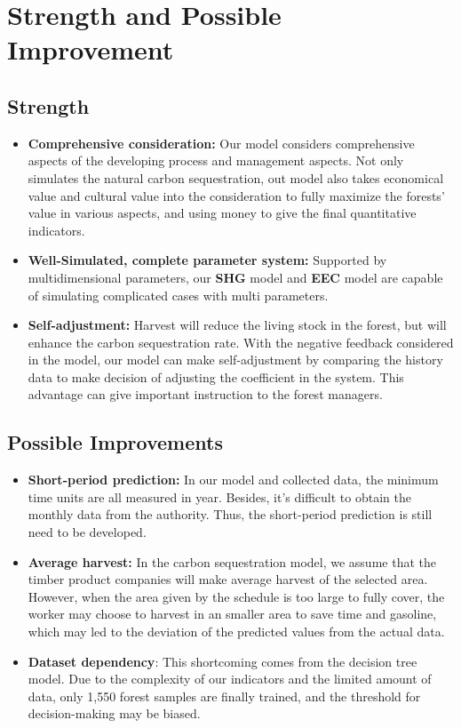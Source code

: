 \section{Strength and Possible Improvement}
\subsection{Strength}
\begin{itemize}

\item \textbf{Comprehensive consideration:} Our model considers comprehensive aspects of the developing process and management aspects. Not only simulates the natural carbon sequestration, out model also takes economical value and cultural value into the consideration to fully maximize the forests' value in various aspects, and using money to give the final quantitative indicators.

\item \textbf{Well-Simulated, complete parameter system:} Supported by multidimensional parameters, our \textbf{SHG} model and \textbf{EEC} model are capable of simulating complicated cases with multi parameters.

\item \textbf{Self-adjustment:} Harvest will reduce the living stock in the forest, but will enhance the carbon sequestration rate. With the negative feedback considered in the model, our model can make self-adjustment by comparing the history data to make decision of adjusting the coefficient in the system. This advantage can give important instruction to the forest managers.

\end{itemize}
\subsection{Possible Improvements}
\begin{itemize}

\item \textbf{Short-period prediction:} In our model and collected data, the minimum time units are all measured in year. Besides, it's difficult to obtain the monthly data from the authority. Thus, the short-period prediction is still need to be developed. 

\item \textbf{Average harvest:} In the carbon sequestration model, we assume that the timber product companies will make average harvest of the selected area. However, when the area given by the schedule is too large to fully cover, the worker may choose to harvest in an smaller area to save time and gasoline, which may led to the deviation of the predicted values from the actual data.

\item \textbf{Dataset dependency}: This shortcoming comes from the decision tree model. Due to the complexity of our indicators and the limited amount of data, only 1,550 forest samples are finally trained, and the threshold for decision-making may be biased.
\end{itemize}

